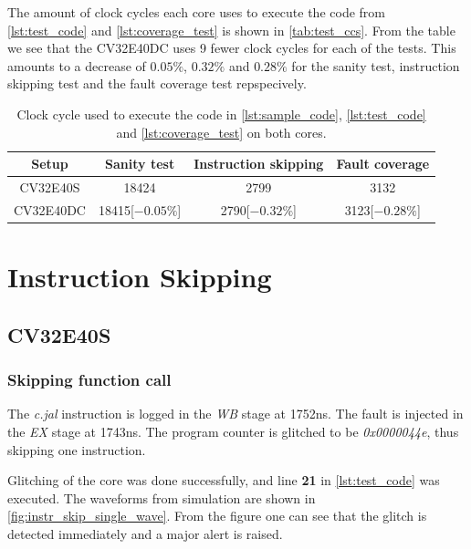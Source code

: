 The amount of clock cycles each core uses to execute the code from \autoref{lst:test_code} and \autoref{lst:coverage_test} is shown in \autoref{tab:test_ccs}. From the table we see that the CV32E40DC uses 9 fewer clock cycles for each of the tests. This amounts to a decrease of $0.05\%$, $0.32\%$ and $0.28\%$ for the sanity test, instruction skipping test and the fault coverage test repspecively. 

\begin{table}[h]
\centering
\caption{Clock cycle used to execute the code in \autoref{lst:sample_code}, \autoref{lst:test_code} and \autoref{lst:coverage_test} on both cores.}
\label{tab:test_ccs}
\begin{tabular}{c|ccc}
\toprule 
Setup & Sanity test & Instruction skipping & Fault coverage \\
\midrule
\rowcolor{black!20} CV32E40S & 18424 & 2799 & 3132\\
CV32E40DC & 18415[$-0.05\%$] & 2790[$-0.32\%$] & 3123[$-0.28\%$]\\
\bottomrule
\end{tabular}
\end{table}

\section{Instruction Skipping}
\label{sec:instr_skip_result}

\subsection{CV32E40S}
\label{subsec:single_instr_skip}

\subsubsection{Skipping function call}
\label{subsubsec:func_call}

The \textit{c.jal} instruction is logged in the \textit{WB} stage at 1752ns. The fault is injected in the \textit{EX} stage at 1743ns. The program counter is glitched to be \textit{0x0000044e}, thus skipping one instruction. 

Glitching of the core was done successfully, and line \textbf{21} in \autoref{lst:test_code} was executed. The waveforms from simulation are shown in \autoref{fig:instr_skip_single_wave}. From the figure one can see that the glitch is detected immediately and a major alert is raised. 

